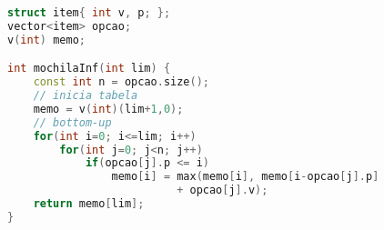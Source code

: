 \begin{lstlisting}[language=c++, title=Itens nunca acabam]
struct item{ int v, p; };  
vector<item> opcao;
v(int) memo;

int mochilaInf(int lim) {
    const int n = opcao.size(); 
    // inicia tabela
    memo = v(int)(lim+1,0);
    // bottom-up
    for(int i=0; i<=lim; i++) 
        for(int j=0; j<n; j++) 
            if(opcao[j].p <= i) 
                memo[i] = max(memo[i], memo[i-opcao[j].p] 
                          + opcao[j].v); 
    return memo[lim]; 
}
\end{lstlisting}